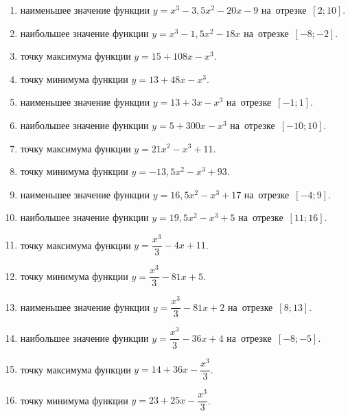 \documentclass[a4paper,10pt]{article}
\begin{document}
\begin{enumerate}
\item {} наименьшее значение функции $y=x^3 -3,5x^2-20x-9$ на~отрезке~$\left[2;10\right]$.

\item {} наибольшее значение функции $y=x^3 -1,5x^2-18x$ на~отрезке~$\left[-8;-2\right]$.

\item {} точку максимума функции $y=15+108x-x^3$.

\item {} точку минимума функции $y=13+48x-x^3$.

\item {} наименьшее значение функции $y=13+3x-x^3$ на~отрезке~$\left[-1;1\right]$.

\item {} наибольшее значение функции $y=5+300x-x^3$ на~отрезке~$\left[-10;10\right]$.

\item {} точку максимума функции $y=21x^2-x^3+11$.

\item {} точку минимума функции $y=-13,5x^2-x^3+93$.

\item {} наименьшее значение функции $y=16,5x^2-x^3+17$ на~отрезке~$\left[-4;9\right]$.

\item {} наибольшее значение функции $y=19,5x^2-x^3+5$ на~отрезке~$\left[11;16\right]$.

\item {} точку максимума функции $y=\dfrac{x^3}{3} -4x+11$.

\item {} точку минимума функции $y=\dfrac{x^3}{3} -81x+5$.

\item {} наименьшее значение функции $y=\dfrac{x^3}{3} -81x+2$ на~отрезке~$\left[8;13\right]$.

\item {} наибольшее значение функции $y=\dfrac{x^3}{3} -36x+4$ на~отрезке~$\left[-8;-5\right]$.

\item {} точку максимума функции $y=14 +36x-\dfrac{x^3}{3}$.

\item {} точку минимума функции $y=23 +25x-\dfrac{x^3}{3}$.


\end{enumerate}
\end{document}
